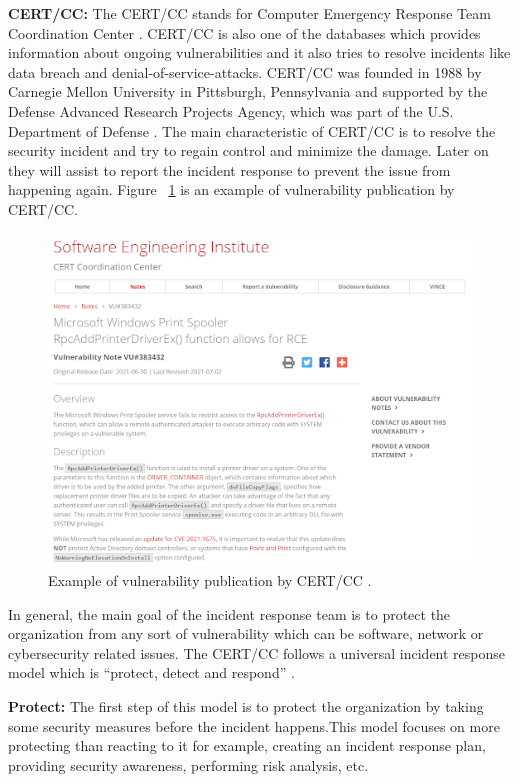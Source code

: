 {\bf CERT/CC:} The \acs{CERT/CC} stands for Computer Emergency Response Team Coordination Center \cite{Web2021}. \acs{CERT/CC} is also one of the databases which provides information about ongoing vulnerabilities and it also tries to resolve incidents like data breach and denial-of-service-attacks. \acs{CERT/CC} was founded in 1988 by Carnegie Mellon University in Pittsburgh, Pennsylvania and supported by the Defense Advanced Research Projects Agency, which was part of the U.S. Department of Defense \cite{CertDiv}. The main characteristic of \acs{CERT/CC} is to resolve the security incident and try to regain control and minimize the damage. Later on they will assist to report the incident response to prevent the issue from happening again. Figure ~\ref{fig:cert} is an example of vulnerability publication by \acs{CERT/CC}.
\newpage
\begin{figure}[H]
	\includegraphics[width=15cm]{includes/cert-cc.png}
	\centering
	\caption{Example of vulnerability publication by \acs{CERT/CC} \cite{CertDiv}.}
	\label{fig:cert}
\end{figure}

In general, the main goal of the incident response team is to protect the organization from any sort of vulnerability which can be software, network or cybersecurity related issues. The \acs{CERT/CC} follows a universal incident response model which is “protect, detect and respond” \cite{DiWhGo2004}.

	\textbf{Protect:} The first step of this model is to protect the organization by taking some security measures before the incident happens.This model focuses on more protecting than reacting to it for example, creating an incident response plan, providing security awareness, performing risk analysis, etc.
	
